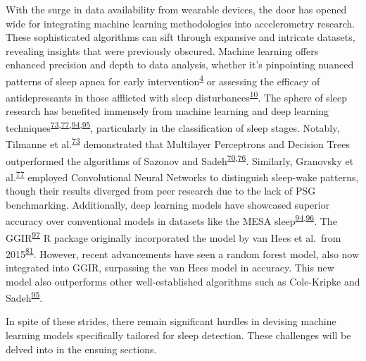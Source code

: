 \documentclass[
  10pt,
]{scrbook}
\begin{document}
With the surge in data availability from wearable devices, the door has
opened wide for integrating machine learning methodologies into
accelerometry research. These sophisticated algorithms can sift through
expansive and intricate datasets, revealing insights that were
previously obscured. Machine learning offers enhanced precision and
depth to data analysis, whether it's pinpointing nuanced patterns of
sleep apnea for early
intervention\textsuperscript{\protect\hyperlink{ref-cappuccio_sleep_2010}{4}}
or assessing the efficacy of antidepressants in those afflicted with
sleep
disturbances\textsuperscript{\protect\hyperlink{ref-paruthi_consensus_2016}{10}}.
The sphere of sleep research has benefited immensely from machine
learning and deep learning
techniques\textsuperscript{\protect\hyperlink{ref-tilmanne_2009}{73},\protect\hyperlink{ref-granovsky_actigraphy-based_2018}{77},\protect\hyperlink{ref-palotti_benchmark_2019}{94},\protect\hyperlink{ref-sundararajan_sleep_2021}{95}},
particularly in the classification of sleep stages. Notably, Tilmanne et
al.\textsuperscript{\protect\hyperlink{ref-tilmanne_2009}{73}}
demonstrated that Multilayer Perceptrons and Decision Trees outperformed
the algorithms of Sazonov and
Sadeh\textsuperscript{\protect\hyperlink{ref-sadeh_activity-based_1994}{70},\protect\hyperlink{ref-sazonov_activity-based_2004}{76}}.
Similarly, Granovsky et
al.\textsuperscript{\protect\hyperlink{ref-granovsky_actigraphy-based_2018}{77}}
employed Convolutional Neural Networks to distinguish sleep-wake
patterns, though their results diverged from peer research due to the
lack of PSG benchmarking. Additionally, deep learning models have
showcased superior accuracy over conventional models in datasets like
the MESA
sleep\textsuperscript{\protect\hyperlink{ref-palotti_benchmark_2019}{94},\protect\hyperlink{ref-lutsey_objectively_2015}{96}}.
The GGIR\textsuperscript{\protect\hyperlink{ref-migueles_ggir_2019}{97}}
R package originally incorporated the model by van Hees et al.~from
2015\textsuperscript{\protect\hyperlink{ref-hees_novel_2015}{81}}.
However, recent advancements have seen a random forest model, also now
integrated into GGIR, surpassing the van Hees model in accuracy. This
new model also outperforms other well-established algorithms such as
Cole-Kripke and
Sadeh\textsuperscript{\protect\hyperlink{ref-sundararajan_sleep_2021}{95}}.

In spite of these strides, there remain significant hurdles in devising
machine learning models specifically tailored for sleep detection. These
challenges will be delved into in the ensuing sections.
\end{document}
